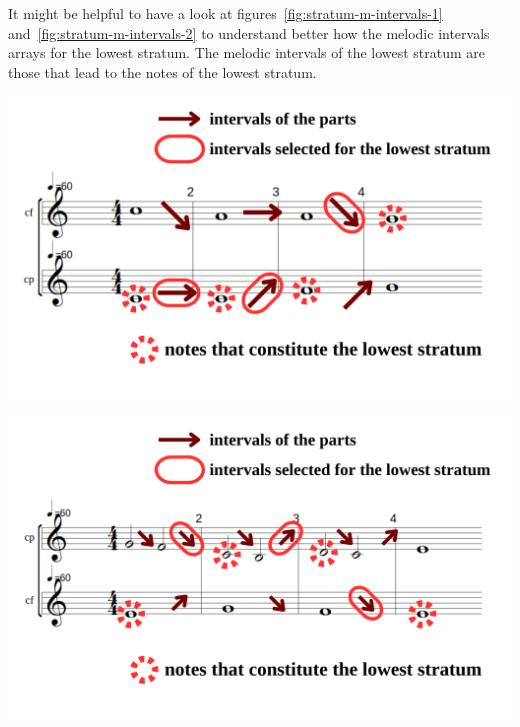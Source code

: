 \noindent It might be helpful to have a look at figures~\ref{fig:stratum-m-intervals-1} and~\ref{fig:stratum-m-intervals-2} to understand better how the melodic intervals arrays for the lowest stratum. The melodic intervals of the lowest stratum are those that lead to the notes of the lowest stratum.

\vspace{.5cm}
\begin{minipage}{0.46\textwidth}
    \centering
    \includegraphics[width=\textwidth]{Images/stratum-m-intervals.png}
    \label{fig:stratum-m-intervals-1}
    \end{minipage}
    \hfill
    \begin{minipage}{0.46\textwidth}
      \centering
      \includegraphics[width=\textwidth]{Images/stratum-m-intervals2.png}
      \label{fig:stratum-m-intervals-2}
\end{minipage}

